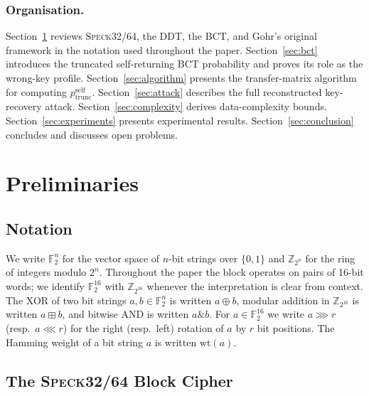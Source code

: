 \documentclass[runningheads]{llncs}
\newcommand{\pself}{p^{\mathrm{self}}_{\mathrm{trunc}}}
\newcommand{\speck}{\textsc{Speck}32/64}
\newcommand{\xor}{\oplus}
\begin{document}
\subsubsection{Organisation.}
Section~\ref{sec:prelim} reviews \speck{}, the DDT, the BCT, and
Gohr's original framework in the notation used throughout the paper.
Section~\ref{sec:bct} introduces the truncated self-returning BCT
probability and proves its role as the wrong-key profile.
Section~\ref{sec:algorithm} presents the transfer-matrix algorithm for
computing $\pself$.
Section~\ref{sec:attack} describes the full reconstructed key-recovery
attack.
Section~\ref{sec:complexity} derives data-complexity bounds.
Section~\ref{sec:experiments} presents experimental results.
Section~\ref{sec:conclusion} concludes and discusses open problems.


\section{Preliminaries}
\label{sec:prelim}

\subsection{Notation}

We write $\mathbb{F}_2^n$ for the vector space of $n$-bit strings over $\{0,1\}$
and $\mathbb{Z}_{2^n}$ for the ring of integers modulo $2^n$.
Throughout the paper the block operates on pairs of 16-bit words; we
identify $\mathbb{F}_2^{16}$ with $\mathbb{Z}_{2^{16}}$ whenever the
interpretation is clear from context.
The XOR of two bit strings $a,b \in \mathbb{F}_2^n$ is written $a \xor b$,
modular addition in $\mathbb{Z}_{2^{16}}$ is written $a \boxplus b$, and
bitwise AND is written $a \mathbin{\&} b$.
For $a \in \mathbb{F}_2^{16}$ we write $a \ggg r$ (resp.\ $a \lll r$) for the
right (resp.\ left) rotation of $a$ by $r$ bit positions.
The Hamming weight of a bit string $a$ is written $\mathrm{wt}(a)$.

\subsection{The \speck{} Block Cipher}
\end{document}
